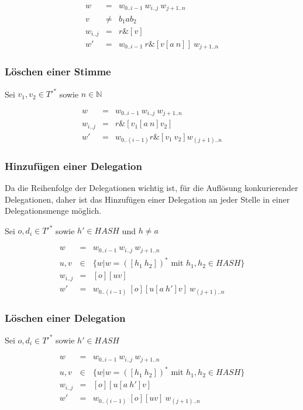 \documentclass[a4paper,12pt]{article}
\begin{document}
\begin{eqnarray}
  w &=& w_{0 .. i-1}\ w_{i..j}\ w_{j+1 .. n} \\
  v &\neq& b_1 a b_2 \\
  w_{i..j} &=& r\& [v] \\
  w' &=& w_{0 .. i-1}\ r \& [v[a\ n]]\ w_{j+1 .. n}
\end{eqnarray}

\subsubsection*{Löschen einer Stimme}

Sei $v_1, v_2 \in T'^*$ sowie $n\in\mathbb{N}$

\begin{eqnarray}
  w &=& w_{0 .. i-1}\ w_{i..j}\ w_{j+1 .. n} \\
  w_{i..j}&=& r\& [v_1 [a\ n] v_2] \\
  w' &=& w_{0..(i-1)} r\& [v_1\ v_2] w_{(j+1)..n}
\end{eqnarray}


\subsubsection*{Hinzufügen einer Delegation}
Da die Reihenfolge der Delegationen wichtig ist, für die Auflösung konkurierender Delegationen, daher ist das Hinzufügen einer Delegation an jeder Stelle in einer Delegationsmenge möglich.

Sei $o,d_i \in T'^*$ sowie $h'\in HASH$ und $h\neq a$

\begin{eqnarray}
  w &=& w_{0 .. i-1}\ w_{i..j}\ w_{j+1 .. n} \\
  u,v &\in& \{ w | w = ([h_1\ h_2])^*\text{ mit } h_1,h_2 \in HASH \} \\
  w_{i..j} &=& [o][uv] \\
  w' &=& w_{0 .. (i-1)}\ [o][u[a\ h']v]\ w_{(j+1) .. n}
\end{eqnarray}

\subsubsection*{Löschen einer Delegation}

Sei $o,d_i \in T'^*$ sowie $h'\in HASH$

\begin{eqnarray}
  w &=& w_{0 .. i-1}\ w_{i..j}\ w_{j+1 .. n} \\
  u,v &\in& \{ w | w = ([h_1\ h_2])^*\text{ mit } h_1,h_2 \in HASH \} \\
  w_{i..j} &=& [o][u[a\ h']v] \\
  w' &=& w_{0 .. (i-1)}\ [o][uv]\ w_{(j+1) .. n}
\end{eqnarray}
\end{document}
